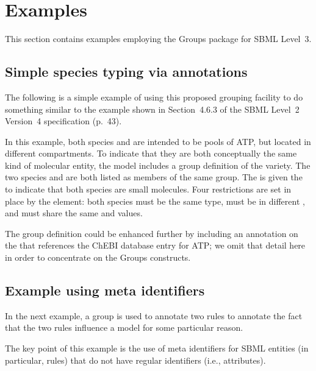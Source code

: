 
\section{Examples}
\label{examples}

This section contains examples employing the Groups package for SBML Level~3.

\subsection{Simple species typing via annotations}
\label{examples-speciestype}

The following is a simple example of using this proposed grouping facility to do something similar to the \SpeciesType example shown in Section~4.6.3 of the SBML Level~2 Version~4 specification (p.~43).


In this example, both species  and  are intended to be pools of ATP, but located in different compartments.  To indicate that they are both conceptually the same kind of molecular entity, the model includes a group definition of the  variety.  The two species  and  are both listed as members of the same group.  The \ListOfMembers is given the   to indicate that both species are small molecules.  Four restrictions are set in place by the \MemberConstraints element:  both species must be the same type, must be in different , and must share the same  and  values.

The group definition could be enhanced further by including an annotation on the \ListOfMembers that references the ChEBI database entry for ATP; we omit that detail here in order to concentrate on the Groups constructs.


\subsection{Example using meta identifiers}

In the next example, a group is used to annotate two rules to annotate the fact that the two rules influence a model for some particular reason.


The key point of this example is the use of meta identifiers for SBML entities (in particular, rules) that do not have regular identifiers (i.e.,  attributes).
